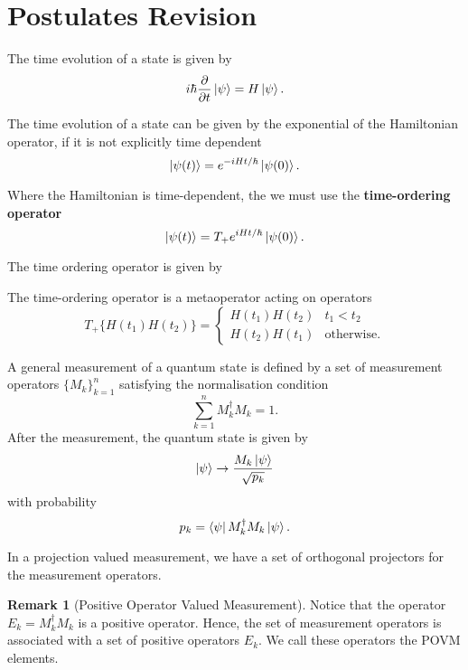 \documentclass[twoside,symmetric, openany, 12pt]{./tuftebook}
\theoremstyle{definition}
\newtheorem{Remark}[Theorem]{Remark}
\theoremstyle{definition}
\theoremstyle{definition}
\begin{document}
\section{Postulates Revision}
\begin{Postulate}
	The time evolution of a state is given by
	\[
		i\hbar \pdv{t}\ket{\psi} = H\ket{\psi}
	.\] 
\end{Postulate}
\begin{Theorem}
	The time evolution of a state can be given by the exponential of the Hamiltonian operator, if it is not explicitly time dependent
	\[
		\ket{\psi(t)} = e^{-iH t / \hbar}\ket{\psi(0)}
	.\] 
\end{Theorem}
\begin{Theorem}
	Where the Hamiltonian is time-dependent, the we must use the \textbf{time-ordering operator}
	\[
		\ket{\psi(t)} = T_+ e^{i H t / \hbar} \ket{\psi(0)}
	.\] 
\end{Theorem}
The time ordering operator is given by
\begin{Definition}
	The time-ordering operator is a metaoperator acting on operators
	\[
		T_+\{ H(t_1)H(t_2)\} = \begin{cases}
			H(t_1)H(t_2) & t_1 < t_2\\
			H(t_2)H(t_1) & \text{otherwise}.
		\end{cases}
	\] 
\end{Definition}
\begin{Postulate}
	A general measurement of a quantum state is defined by a set of measurement operators $\{M_k\}_{k=1}^n$ satisfying the normalisation condition
	\[
	\sum_{k=1}^{n} M_k^\dagger M_k =1
	.\] 
	After the measurement, the quantum state is given by
	\[
		\ket{\psi}\to \frac{M_k \ket{\psi}}{\sqrt{p_k} }
	\] 
	with probability
\[
	p_k = \bra{\psi}M_k^\dagger M_k\ket{\psi}
.\] 
\end{Postulate}
\begin{Example}
	In a projection valued measurement, we have a set of orthogonal projectors for the measurement operators. 
\end{Example}

\begin{Remark}[Positive Operator Valued Measurement]
	Notice that the operator $E_k = M_k^\dagger M_k$ is a positive operator. Hence, the set of measurement operators is associated with a set of positive operators $E_k$. We call these operators the POVM elements.
\end{Remark}
\end{document}
